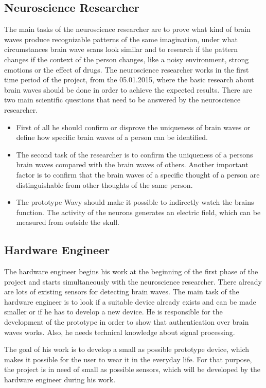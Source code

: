 \subsection{Neuroscience Researcher}
The main tasks of the neuroscience researcher are to prove what kind of brain waves produce recognizable patterns of the same imagination, under what circumstances brain wave scans look similar and to research if the pattern changes if the context of the person changes, like a noisy environment, strong emotions or the effect of drugs.
The neuroscience researcher works in the first time period of the project, from the 05.01.2015, where the basic research about brain waves should be done in order to achieve the expected results. There are two main scientific questions that need to be answered by the neuroscience researcher.
\begin{itemize}
\item{
First of all he should confirm or disprove the uniqueness of brain waves or define how specific brain waves of a person can be identified.
}
\item{
The second task of the researcher is to confirm the uniqueness of a persons brain waves compared with the brain waves of others. Another important factor is to confirm that the brain waves of a specific thought of a person are distinguishable from other thoughts of the same person.
}
\item{
The prototype Wavy should make it possible to indirectly watch the brains function. The activity of the neurons generates an electric field, which can be measured from  outside the skull.
}
\end{itemize}

\subsection{Hardware Engineer}                         	
The hardware engineer begins his work at the beginning of the first phase of the project and starts simultaneously with the neuroscience researcher. There already are lots of existing sensors for detecting brain waves. The main task of the hardware engineer is to look if a suitable device already exists and can be made smaller or if he has to develop a new device. He is responsible for the development of the prototype in order to show that authentication over brain waves works. Also, he needs technical knowledge about signal processing.

The goal of his work is to develop a small as possible prototype device, which makes it possible for the user to wear it in the everyday life. For that purpose, the project is in need of small as possible sensors, which will be developed by the hardware engineer during his work.

